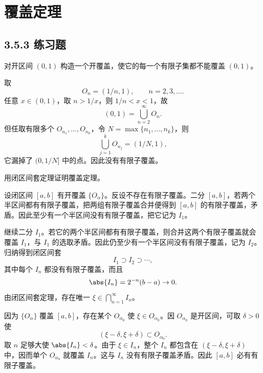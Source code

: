 \section{覆盖定理}
\subsection*{3.5.3 练习题}

\begin{xexercise}[3.5.3 练习题 1]
对开区间 $(0,1)$ 构造一个开覆盖，使它的每一个有限子集都不能覆盖 $(0,1)$。
\end{xexercise}
\begin{xsolution}
取
\[
  O_n=(1/n,1),\qquad n=2,3,\ldots.
\]
任意 $x\in(0,1)$，取 $n>1/x$，则 $1/n<x<1$，故
\[
  (0,1)=\bigcup_{n=2}^{\infty}O_n.
\]
但任取有限多个 $O_{n_1},\ldots,O_{n_k}$，令 $N=\max\{n_1,\ldots,n_k\}$，则
\[
  \bigcup_{j=1}^{k}O_{n_j}=(1/N,1),
\]
它漏掉了 $(0,1/N]$ 中的点。因此没有有限子覆盖。
\end{xsolution}

\begin{xexercise}[3.5.3 练习题 2]
用闭区间套定理证明覆盖定理。
\end{xexercise}
\begin{xsolution}
设闭区间 $[a,b]$ 有开覆盖 $\{O_\alpha\}$。反设不存在有限子覆盖。二分 $[a,b]$，若两个半区间都有有限子覆盖，把两组有限子覆盖合并便得到 $[a,b]$ 的有限子覆盖，矛盾。因此至少有一个半区间没有有限子覆盖，把它记为 $I_1$。

继续二分 $I_1$。若它的两个半区间都有有限子覆盖，则合并这两个有限子覆盖就会覆盖 $I_1$，与 $I_1$ 的选取矛盾。因此仍至少有一个半区间没有有限子覆盖，记为 $I_2$。归纳得到闭区间套
\[
  I_1\supset I_2\supset\cdots,
\]
其中每个 $I_n$ 都没有有限子覆盖，而且
\[
  \abs{I_n}=2^{-n}(b-a)\to0.
\]
由闭区间套定理，存在唯一 $\xi\in\bigcap_{n=1}^{\infty}I_n$。

因为 $\{O_\alpha\}$ 覆盖 $[a,b]$，存在某个 $O_{\alpha_0}$ 使 $\xi\in O_{\alpha_0}$。因 $O_{\alpha_0}$ 是开区间，可取 $\delta>0$ 使
\[
  (\xi-\delta,\xi+\delta)\subset O_{\alpha_0}.
\]
取 $n$ 足够大使 $\abs{I_n}<\delta$。由于 $\xi\in I_n$，整个 $I_n$ 都包含在 $(\xi-\delta,\xi+\delta)$ 中，因而单个 $O_{\alpha_0}$ 就覆盖 $I_n$。这与 $I_n$ 没有有限子覆盖矛盾。因此 $[a,b]$ 必有有限子覆盖。
\end{xsolution}

